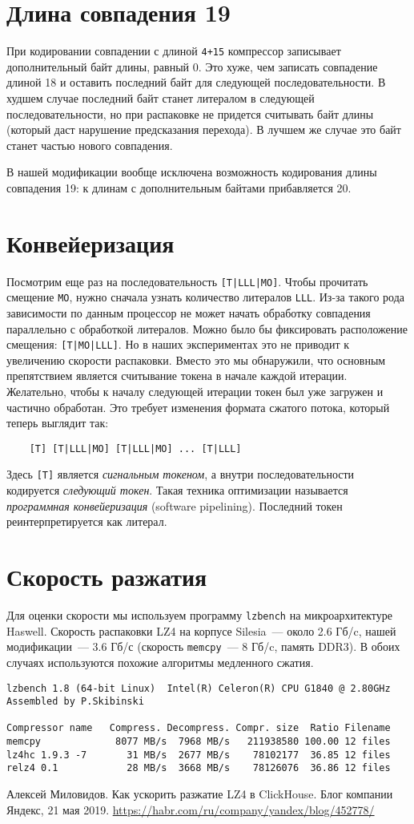 \documentclass[russian,a4paper,12pt]{article}
\begin{document}
\section{Длина совпадения 19}
При кодировании совпадении с длиной \verb|4+15| компрессор записывает дополнительный байт длины, равный 0.
Это хуже, чем записать совпадение длиной 18 и оставить последний байт для следующей последовательности.
В худшем случае последний байт станет литералом в следующей последовательности, но при распаковке не придется
считывать байт длины (который даст нарушение предсказания перехода).  В лучшем же случае это байт
станет частью нового совпадения.

В нашей модификации вообще исключена возможность кодирования длины совпадения 19: к длинам с дополнительным
байтами прибавляется 20.

\section{Конвейеризация}
Посмотрим еще раз на последовательность \verb![T|LLL|MO]!.  Чтобы прочитать смещение \verb|MO|,
нужно сначала узнать количество литералов \verb|LLL|.  Из-за такого рода зависимости по данным
процессор не может начать обработку совпадения параллельно с обработкой литералов.  Можно было бы
фиксировать расположение смещения: \verb![T|MO|LLL]!.  Но в наших экспериментах это не приводит
к увеличению скорости распаковки.  Вместо это мы обнаружили, что основным препятствием является
считывание токена в начале каждой итерации.  Желательно, чтобы к началу следующей итерации токен
был уже загружен и частично обработан.  Это требует изменения формата сжатого потока, который
теперь выглядит так:
\begin{verbatim}
    [T] [T|LLL|MO] [T|LLL|MO] ... [T|LLL]
\end{verbatim}
Здесь \verb![T]! является \emph{сигнальным токеном}, а внутри последовательности кодируется
\emph{следующий токен}.  Такая техника оптимизации называется \emph{программная конвейеризация}
(software pipelining).  Последний токен реинтерпретируется как литерал.

\section{Скорость разжатия}
Для оценки скорости мы используем программу \verb|lzbench| на микроархитектуре Haswell.
Скорость распаковки LZ4 на корпусе Silesia~--- около 2.6 Гб/c, нашей модификации~--- 3.6 Гб/с
(скорость \verb|memcpy|~--- 8 Гб/c, память DDR3).  В обоих случаях используются похожие алгоритмы медленного сжатия.
\begin{verbatim}
lzbench 1.8 (64-bit Linux)  Intel(R) Celeron(R) CPU G1840 @ 2.80GHz
Assembled by P.Skibinski

Compressor name   Compress. Decompress. Compr. size  Ratio Filename
memcpy             8077 MB/s  7968 MB/s   211938580 100.00 12 files
lz4hc 1.9.3 -7       31 MB/s  2677 MB/s    78102177  36.85 12 files
relz4 0.1            28 MB/s  3668 MB/s    78126076  36.86 12 files
\end{verbatim}

\begin{thebibliography}{9}
 Алексей Миловидов.
Как ускорить разжатие LZ4 в ClickHouse.
Блог компании Яндекс, 21 мая 2019.
\url{https://habr.com/ru/company/yandex/blog/452778/}
\end{thebibliography}
\end{document}
